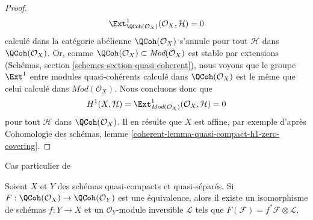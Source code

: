 \begin{proof}
$$
\Ext^1_{\QCoh(\mathcal{O}_X)}(\mathcal{O}_X, \mathcal{H}) = 0
$$
calculé dans la catégorie abélienne $\QCoh(\mathcal{O}_X)$ s'annule pour
tout $\mathcal{H}$ dans $\QCoh(\mathcal{O}_X)$. Or, comme
$\QCoh(\mathcal{O}_X) \subset \textit{Mod}(\mathcal{O}_X)$
est stable par extensions (Schémas, section
\ref{schemes-section-quasi-coherent}), nous voyons que le groupe $\Ext^1$
entre modules quasi-cohérents calculé dans $\QCoh(\mathcal{O}_X)$ est le même
que celui calculé dans $\textit{Mod}(\mathcal{O}_X)$. Nous concluons donc que
$$
H^1(X, \mathcal{H}) =
\Ext^1_{\textit{Mod}(\mathcal{O}_X)}(\mathcal{O}_X, \mathcal{H}) = 0
$$
pour tout $\mathcal{H}$ dans $\QCoh(\mathcal{O}_X)$.
Il en résulte que $X$ est affine, par exemple d'après
Cohomologie des schémas, lemme
\ref{coherent-lemma-quasi-compact-h1-zero-covering}.
\end{proof}

\begin{proposition}
\label{proposition-gabriel-rosenberg}
\begin{reference}
Cas particulier de \cite[Theorem 1.2]{Brandenburg}
\end{reference}
Soient $X$ et $Y$ des schémas quasi-compacts et quasi-séparés.
Si $F : \QCoh(\mathcal{O}_X) \to \QCoh(\mathcal{O}_Y)$
est une équivalence, alors il existe un isomorphisme de schémas
$f : Y \to X$ et un $\mathcal{O}_Y$-module inversible
$\mathcal{L}$ tels que $F(\mathcal{F}) = f^*\mathcal{F} \otimes \mathcal{L}$.
\end{proposition}

